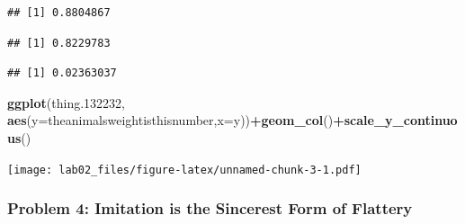 \documentclass[
]{article}
\newenvironment{Shaded}{\begin{snugshade}}{\end{snugshade}}
\newcommand{\AttributeTok}[1]{\textcolor[rgb]{0.13,0.29,0.53}{#1}}
\newcommand{\ConstantTok}[1]{\textcolor[rgb]{0.56,0.35,0.01}{#1}}
\newcommand{\DecValTok}[1]{\textcolor[rgb]{0.00,0.00,0.81}{#1}}
\newcommand{\FloatTok}[1]{\textcolor[rgb]{0.00,0.00,0.81}{#1}}
\newcommand{\FunctionTok}[1]{\textcolor[rgb]{0.13,0.29,0.53}{\textbf{#1}}}
\newcommand{\NormalTok}[1]{#1}
\newcommand{\OtherTok}[1]{\textcolor[rgb]{0.56,0.35,0.01}{#1}}
\newcommand{\SpecialCharTok}[1]{\textcolor[rgb]{0.81,0.36,0.00}{\textbf{#1}}}
\newcommand{\StringTok}[1]{\textcolor[rgb]{0.31,0.60,0.02}{#1}}
\begin{document}
\begin{Shaded}
\end{Shaded}

\begin{verbatim}
## [1] 0.8804867
\end{verbatim}

\begin{verbatim}
## [1] 0.8229783
\end{verbatim}

\begin{verbatim}
## [1] 0.02363037
\end{verbatim}

\begin{Shaded}
\begin{Highlighting}[]
\FunctionTok{ggplot}\NormalTok{(thing}\FloatTok{.132232}\NormalTok{, }\FunctionTok{aes}\NormalTok{(}\AttributeTok{y=}\NormalTok{theanimalsweightisthisnumber,}\AttributeTok{x=}\NormalTok{y))}\SpecialCharTok{+}\FunctionTok{geom\_col}\NormalTok{()}\SpecialCharTok{+}\FunctionTok{scale\_y\_continuous}\NormalTok{()}
\end{Highlighting}
\end{Shaded}

\texttt{[image: lab02\_files/figure-latex/unnamed-chunk-3-1.pdf]}

\hypertarget{problem-4-imitation-is-the-sincerest-form-of-flattery}{%
\subsubsection{Problem 4: Imitation is the Sincerest Form of
Flattery}\label{problem-4-imitation-is-the-sincerest-form-of-flattery}}
\end{document}
